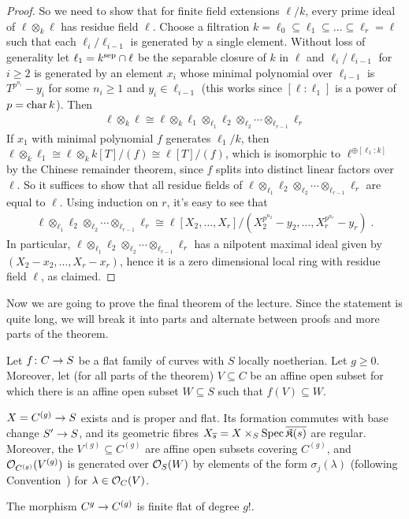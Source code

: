 \documentclass[a4paper,parskip=half,numbers=enddot, DIV=12]{scrreprt}
\renewcommand{\geq}{\geqslant}
\begin{document}
\begin{proof}
	So we need to show that for finite field extensions $\ell/k$, every prime ideal of $\ell\otimes_k\ell$ has residue field $\ell$. Choose a filtration $k=\ell_0\subseteq \ell_1\subseteq\ldots\subseteq\ell_r=\ell$ such that each $\ell_i/\ell_{i-1}$ is generated by a single element. Without loss of generality let $\ell_1=k^{\mathrm{sep}}\cap \ell$ be the separable closure of $k$ in $\ell$ and $\ell_i/\ell_{i-1}$ for $i\geq 2$ is generated by an element $x_i$ whose minimal polynomial over $\ell_{i-1}$ is $T^{p^{n_i}}-y_i$ for some $n_i\geq 1$ and $y_i\in\ell_{i-1}$ (this works since $[\ell:\ell_1]$ is a power of $p=\operatorname{char} k$). Then
	\begin{align*}
		\ell\otimes_ k\ell\cong \ell\otimes_k\ell_1\otimes_{\ell_1}\ell_2\otimes_{\ell_2}\cdots\otimes_{\ell_{r-1}}\ell_r
	\end{align*}
	If $x_1$ with minimal polynomial $f$ generates $\ell_1/k$, then $\ell\otimes_k\ell_1\cong \ell\otimes_kk[T]/(f)\cong \ell[T]/(f)$, which is isomorphic to $\ell^{\oplus[\ell_1:k]}$ by the Chinese remainder theorem, since $f$ splits into distinct linear factors over $\ell$. So it suffices to show that all residue fields of $\ell\otimes_{\ell_1}\ell_2\otimes_{\ell_2}\cdots\otimes_{\ell_{r-1}}\ell_r$ are equal to $\ell$. Using induction on $r$, it's easy to see that 
	\begin{align*}
		\ell\otimes_{\ell_1}\ell_2\otimes_{\ell_2}\cdots\otimes_{\ell_{r-1}}\ell_r\cong \ell[X_2,\ldots,X_r]/\left(X_2^{p^{n_2}}-y_2,\ldots,X_r^{p^{n_r}}-y_r\right)\;.
	\end{align*}
	In particular, $\ell\otimes_{\ell_1}\ell_2\otimes_{\ell_2}\cdots\otimes_{\ell_{r-1}}\ell_r$ has a nilpotent maximal ideal given by $(X_2-x_2,\ldots,X_r-x_r)$, hence it is a zero dimensional local ring with residue field $\ell$, as claimed.
\end{proof}
Now we are going to prove the final theorem of the lecture. Since the statement is quite long, we will break it into parts and alternate between proofs and more parts of the theorem.
\begin{thm}[beginning]
	Let $f\colon C\morphism S$ be a flat family of curves with $S$ locally noetherian. Let $g\geq 0$. Moreover, let (for all parts of the theorem) $V\subseteq C$ be an affine open subset for which there is an affine open subset $W\subseteq S$ such that $f(V)\subseteq W$.
	\begin{alphanumerate}
		\item $X=C^{(g)}\morphism S$ exists and is proper and flat. Its formation commutes with base change $S'\morphism S$, and its geometric fibres $X_{\overline{s}}=X\times_S\operatorname{Spec} \overline{\mathfrak{K}(s)}$ are regular. Moreover, the $V^{(g)}\subseteq C^{(g)}$ are affine open subsets covering $C^{(g)}$, and $\mathcal{O}_{C^{(g)}}(V^{(g)})$ is generated over $\mathcal{O}_S(W)$ by elements of the form $\sigma_j(\lambda)$ (following Convention~)  for $\lambda\in \mathcal{O}_C(V)$.
		\item The morphism $C^g\morphism C^{(g)}$ is finite flat of degree $g!$. 
	\end{alphanumerate}
\end{thm}
\end{document}
